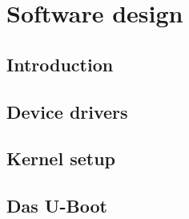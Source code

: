 \chapter{Software design}
\section{Introduction}
%

\section{Device drivers}
%

\section{Kernel setup}
%

\section{Das U-Boot}
%
